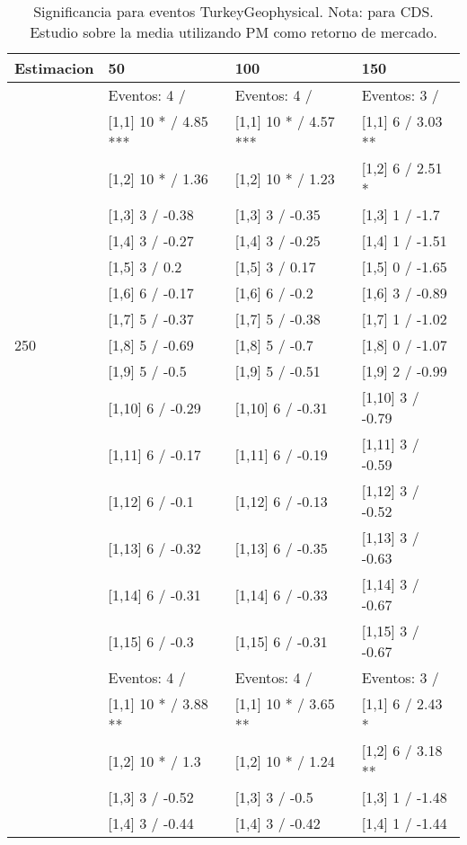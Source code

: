\begin{table}

\caption{Significancia para eventos TurkeyGeophysical. Nota: para CDS. Estudio sobre la media utilizando PM como retorno de mercado.}
\centering
\begin{tabular}[t]{llll}
\toprule
Estimacion & 50 & 100 & 150\\
\midrule
 & Eventos:  4 / & Eventos:  4 / & Eventos:  3 /\\
 & {}[1,1] 10 * / 4.85 *** & {}[1,1] 10 * / 4.57 *** & {}[1,1] 6  / 3.03 **\\
 & {}[1,2] 10 * / 1.36 & {}[1,2] 10 * / 1.23 & {}[1,2] 6  / 2.51 *\\
 & {}[1,3] 3  / -0.38 & {}[1,3] 3  / -0.35 & {}[1,3] 1  / -1.7\\
 & {}[1,4] 3  / -0.27 & {}[1,4] 3  / -0.25 & {}[1,4] 1  / -1.51\\
\addlinespace
 & {}[1,5] 3  / 0.2 & {}[1,5] 3  / 0.17 & {}[1,5] 0  / -1.65\\
 & {}[1,6] 6  / -0.17 & {}[1,6] 6  / -0.2 & {}[1,6] 3  / -0.89\\
 & {}[1,7] 5  / -0.37 & {}[1,7] 5  / -0.38 & {}[1,7] 1  / -1.02\\
250 & {}[1,8] 5  / -0.69 & {}[1,8] 5  / -0.7 & {}[1,8] 0  / -1.07\\
 & {}[1,9] 5  / -0.5 & {}[1,9] 5  / -0.51 & {}[1,9] 2  / -0.99\\
\addlinespace
 & {}[1,10] 6  / -0.29 & {}[1,10] 6  / -0.31 & {}[1,10] 3  / -0.79\\
 & {}[1,11] 6  / -0.17 & {}[1,11] 6  / -0.19 & {}[1,11] 3  / -0.59\\
 & {}[1,12] 6  / -0.1 & {}[1,12] 6  / -0.13 & {}[1,12] 3  / -0.52\\
 & {}[1,13] 6  / -0.32 & {}[1,13] 6  / -0.35 & {}[1,13] 3  / -0.63\\
 & {}[1,14] 6  / -0.31 & {}[1,14] 6  / -0.33 & {}[1,14] 3  / -0.67\\
\addlinespace
 & {}[1,15] 6  / -0.3 & {}[1,15] 6  / -0.31 & {}[1,15] 3  / -0.67\\
 & Eventos:  4 / & Eventos:  4 / & Eventos:  3 /\\
 & {}[1,1] 10 * / 3.88 ** & {}[1,1] 10 * / 3.65 ** & {}[1,1] 6  / 2.43 *\\
 & {}[1,2] 10 * / 1.3 & {}[1,2] 10 * / 1.24 & {}[1,2] 6  / 3.18 **\\
 & {}[1,3] 3  / -0.52 & {}[1,3] 3  / -0.5 & {}[1,3] 1  / -1.48\\
\addlinespace
 & {}[1,4] 3  / -0.44 & {}[1,4] 3  / -0.42 & {}[1,4] 1  / -1.44\\

\end{tabular}
\end{table}
